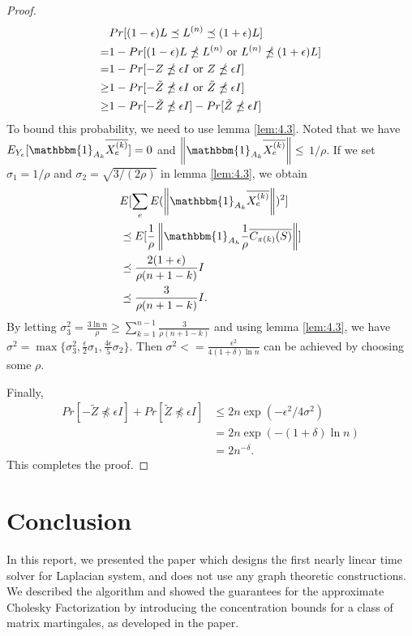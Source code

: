 \documentclass[11pt]{article}
\newcommand{\lnorm}[1]{\ensuremath{\overline{#1}}}
\begin{document}
\begin{proof}
    \begin{align*}
    &Pr[(1-\epsilon) L
   \preceq
   L^{(n)}
   \preceq
   (1+\epsilon) L ] \\
   =& 1 -
   Pr[(1-\epsilon) L
   \npreceq
   L^{(n)} \ \text{or} \ L^{(n)} 
   \npreceq
   (1+\epsilon) L ] \\
   =& 1 -
   Pr[-Z
   \npreceq
   \epsilon I \ \text{or} \ Z
   \npreceq
   \epsilon I ] \\
   \geq& 1-Pr[-\tilde{Z}
   \npreceq
   \epsilon I \ \text{or} \ \tilde{Z}
   \npreceq
   \epsilon I ] \\
   \geq& 1-Pr[-\tilde{Z}
   \npreceq
   \epsilon I] - Pr[ \tilde{Z}
   \npreceq
   \epsilon I ]
\end{align*}
To bound this probability, we need to use lemma \ref{lem:4.3}.
Noted that we have
$E_{Y_e}[\mathbbm{1}_{A_k} \lnorm{X^{(k)}_e}]=0$
and $\norm{\mathbbm{1}_{A_k} \lnorm{X^{(k)}_e}} \leq$ $1/ \rho$.
If we set $\sigma_1 = 1/ \rho $ and $\sigma_2 = \sqrt{3/(2 \rho) }$ in lemma \ref{lem:4.3}, 
we obtain
\begin{align*}
    &E[\sum_{e} E(\norm{\mathbbm{1}_{A_k} \lnorm{X^{(k)}_e}})^2 ] \\
    &\preceq E[\frac{1}{\rho}\norm{\mathbbm{1}_{A_h} \frac{1}{\rho} \lnorm{C_{\pi(k)}(S)}}] \\
    &\preceq \frac{2(1+\epsilon)}{\rho (n+1-k)} I\\
    &\preceq \frac{3}{\rho (n+1-k)} I.
\end{align*}
By letting $\sigma^2_3 = \frac{3 \ln{n}}{\rho} \geq \sum_{k=1}^{n-1} \frac{3}{\rho (n+1-k)} $ and using lemma \ref{lem:4.3}, we have
$\sigma^2 =\max{ \{ \sigma^2_3,
        \frac{\epsilon}{2}\sigma_1,\frac{4\epsilon}{5}\sigma_2} \}$.
Then $\sigma^2 <= \frac{\epsilon^2}{4(1+\delta)\ln{n}}$ can
be achieved by choosing some $\rho$.

Finally, 
\begin{align*}
    Pr[-\tilde{Z} \npreceq \epsilon I] + Pr[ \tilde{Z} \npreceq \epsilon I ] &\leq 2n \exp{(-\epsilon^2/4\sigma^2)} \\
    &=2n \exp{(-(1+\delta)\ln{n})}\\
    &=2n^{-\delta}.
\end{align*}
This completes the proof.
\end{proof}

\section{Conclusion}
In this report, we presented the paper \cite{Kyng16} which designs the first nearly linear time solver for Laplacian system, and does not use any graph theoretic constructions. We described the algorithm and showed the guarantees for the approximate Cholesky Factorization by introducing the concentration bounds for a class of matrix martingales, as developed in the paper.
\end{document}
